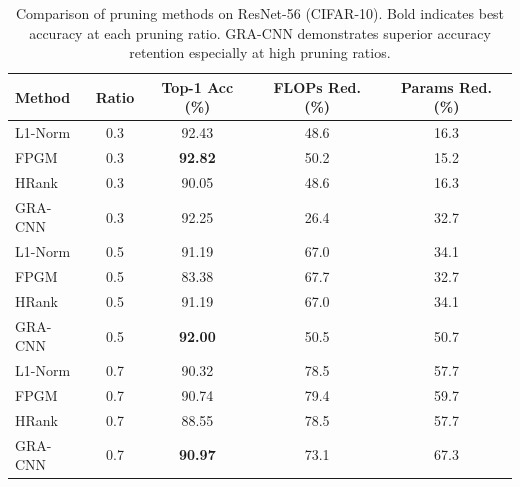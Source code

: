 \begin{table}[ht]
\centering
\caption{Comparison of pruning methods on ResNet-56 (CIFAR-10). Bold indicates best accuracy at each pruning ratio. GRA-CNN demonstrates superior accuracy retention especially at high pruning ratios.}
\label{tab:cifar10_results}
\begin{tabular}{lcccc}
\toprule
Method & Ratio & Top-1 Acc (\%) & FLOPs Red. (\%) & Params Red. (\%) \\
\midrule
L1-Norm & 0.3 & 92.43 & 48.6 & 16.3 \\
FPGM & 0.3 & \textbf{92.82} & 50.2 & 15.2 \\
HRank & 0.3 & 90.05 & 48.6 & 16.3 \\
GRA-CNN & 0.3 & 92.25 & 26.4 & 32.7 \\
\midrule
L1-Norm & 0.5 & 91.19 & 67.0 & 34.1 \\
FPGM & 0.5 & 83.38 & 67.7 & 32.7 \\
HRank & 0.5 & 91.19 & 67.0 & 34.1 \\
GRA-CNN & 0.5 & \textbf{92.00} & 50.5 & 50.7 \\
\midrule
L1-Norm & 0.7 & 90.32 & 78.5 & 57.7 \\
FPGM & 0.7 & 90.74 & 79.4 & 59.7 \\
HRank & 0.7 & 88.55 & 78.5 & 57.7 \\
GRA-CNN & 0.7 & \textbf{90.97} & 73.1 & 67.3 \\
\bottomrule
\end{tabular}
\end{table}